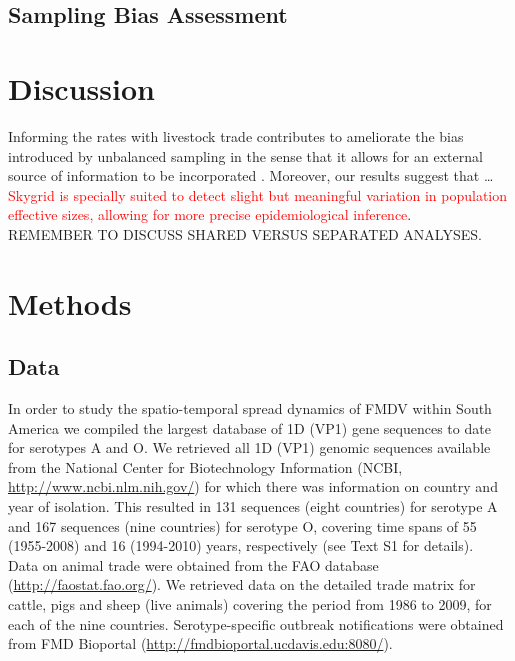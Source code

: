 \documentclass[10pt]{article}
\begin{document}
\subsection*{Sampling Bias Assessment}
\section*{Discussion}
\indent Informing the rates with livestock trade contributes to ameliorate the bias introduced by unbalanced sampling in the sense that it allows for an external source of information to be incorporated \cite{Faria2012}. Moreover, our results suggest that \ldots\\
\indent \textcolor{red}{Skygrid is specially suited to detect slight but meaningful variation in population effective sizes, allowing for more precise epidemiological inference}.\\
\indent REMEMBER TO DISCUSS SHARED VERSUS SEPARATED ANALYSES.\\
\section*{Methods}
\subsection{Data}
\indent In order to study the spatio-temporal spread dynamics of FMDV within South America we compiled the largest database of 1D (VP1) gene sequences to date for serotypes A and O. We retrieved all 1D (VP1) genomic sequences available from the National Center for Biotechnology Information (NCBI, \url{ http://www.ncbi.nlm.nih.gov/}) for which there was information on country and year of isolation.  This resulted in 131 sequences (eight countries) for serotype A and 167 sequences (nine countries) for serotype O, covering time spans of 55 (1955-2008) and 16 (1994-2010) years, respectively (see Text S1 for details).\\
\indent Data on animal trade were obtained from the FAO database (\url{http://faostat.fao.org/}). We retrieved data on the detailed trade matrix for cattle, pigs and sheep (live animals) covering the period from 1986 to 2009, for each of the nine countries. Serotype-specific outbreak notifications were obtained from FMD Bioportal (\url{http://fmdbioportal.ucdavis.edu:8080/}).\\
\end{document}
